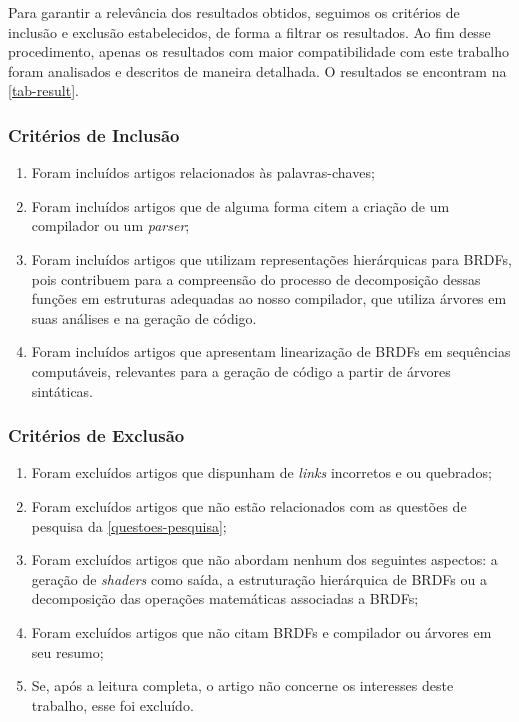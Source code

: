 Para garantir a relevância dos resultados obtidos, seguimos os critérios de inclusão e exclusão estabelecidos, de forma a filtrar os resultados. Ao fim desse procedimento, apenas os resultados com maior compatibilidade com este trabalho foram analisados e descritos de maneira detalhada. O resultados se encontram na \autoref{tab-result}.


\subsubsection{Critérios de Inclusão}


\begin{enumerate}
  \item Foram incluídos artigos relacionados às palavras-chaves;

  \item Foram incluídos artigos que de alguma forma citem a criação de um compilador ou um \textit{parser};

  \item Foram incluídos artigos que utilizam representações hierárquicas para BRDFs, pois contribuem para a compreensão do processo de decomposição dessas funções em estruturas adequadas ao nosso compilador, que utiliza árvores em suas análises e na geração de código.

  \item Foram incluídos artigos que apresentam linearização de BRDFs em sequências computáveis, relevantes para a geração de código a partir de árvores sintáticas.
\end{enumerate}


\subsubsection{Critérios de Exclusão}


\begin{enumerate}
  \item Foram excluídos artigos que dispunham de \textit{links} incorretos e ou quebrados;
  \item Foram excluídos artigos que não estão relacionados com as questões de pesquisa da \autoref{questoes-pesquisa};
  \item Foram excluídos artigos que não abordam nenhum dos seguintes aspectos: a geração de \textit{shaders} como saída, a estruturação hierárquica de BRDFs ou a decomposição das operações matemáticas associadas a BRDFs;

  \item Foram excluídos artigos que não citam BRDFs e compilador ou árvores em seu resumo;
  \item Se, após a leitura completa, o artigo não concerne os interesses deste trabalho, esse foi excluído.
\end{enumerate}




